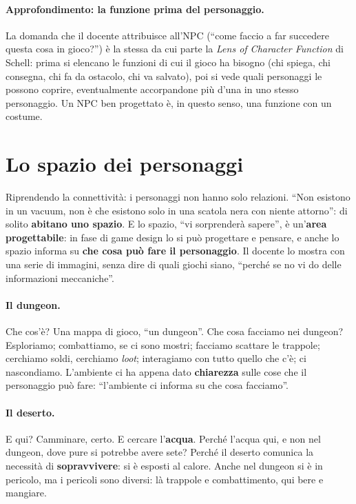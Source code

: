 \paragraph{Approfondimento: la funzione prima del personaggio.} La domanda che il
docente attribuisce all'NPC (``come faccio a far succedere questa cosa in gioco?'')
è la stessa da cui parte la \emph{Lens of Character Function} di Schell: prima si
elencano le funzioni di cui il gioco ha bisogno (chi spiega, chi consegna, chi fa
da ostacolo, chi va salvato), poi si vede quali personaggi le possono coprire,
eventualmente accorpandone più d'una in uno stesso personaggio. Un NPC ben
progettato è, in questo senso, una funzione con un costume.

\section{Lo spazio dei personaggi}
\label{a4:sec:spazio}



Riprendendo la connettività: i personaggi non hanno solo relazioni. ``Non esistono in
un vacuum, non è che esistono solo in una scatola nera con niente attorno'': di
solito \textbf{abitano uno spazio}. E lo spazio, ``vi sorprenderà sapere'', è
un'\textbf{area progettabile}: in fase di game design lo si può progettare e
pensare, e anche lo spazio informa su \textbf{che cosa può fare il personaggio}.
Il docente lo mostra con una serie di immagini, senza dire di quali giochi siano,
``perché se no vi do delle informazioni meccaniche''.

\paragraph{Il dungeon.} Che cos'è? Una mappa di gioco, ``un dungeon''. Che cosa
facciamo nei dungeon? Esploriamo; combattiamo, se ci sono mostri; facciamo scattare
le trappole; cerchiamo soldi, cerchiamo \emph{loot}; interagiamo con tutto quello che
c'è; ci nascondiamo. L'ambiente ci ha appena dato \textbf{chiarezza} sulle cose che
il personaggio può fare: ``l'ambiente ci informa su che cosa facciamo''.

\paragraph{Il deserto.} E qui? Camminare, certo. E cercare l'\textbf{acqua}. Perché
l'acqua qui, e non nel dungeon, dove pure si potrebbe avere sete? Perché il deserto
comunica la necessità di \textbf{sopravvivere}: si è esposti al calore. Anche nel
dungeon si è in pericolo, ma i pericoli sono diversi: là trappole e combattimento,
qui bere e mangiare.

